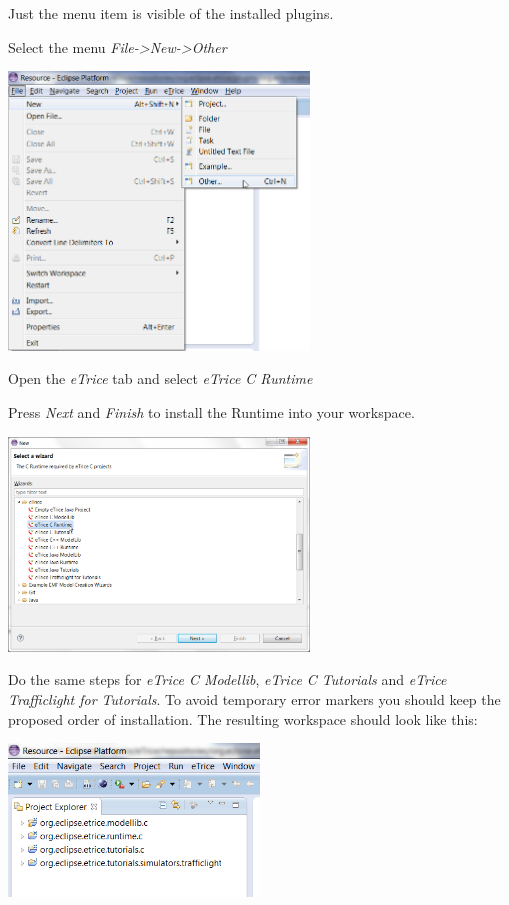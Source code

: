 Just the \eTrice{} menu item is visible of the installed \eTrice{} plugins.

\newpage
Select the menu \emph{File->New->Other}

\includegraphics[width=0.6\textwidth]{images/013-SetupWorkspace02.png}

Open the \emph{eTrice} tab and select \textit{eTrice C Runtime}

Press \emph{Next} and \emph{Finish} to install the Runtime into your workspace.

\includegraphics[width=0.6\textwidth]{images/014-SetupWorkspaceC005.png}

\newpage
Do the same steps for \textit{eTrice C Modellib}, \textit{eTrice C Tutorials} and \textit{eTrice Trafficlight for Tutorials}. To avoid temporary 
error markers you should keep the proposed order of installation. The resulting workspace should look like 
this:

\includegraphics[width=0.5\textwidth]{images/014-SetupWorkspace007.png}

